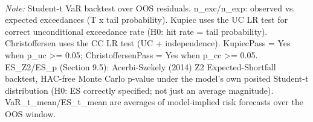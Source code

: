 \begin{table}[ht]
\begin{tabular}{lrrrrrrrrrrrrrrrrrrrrrrrrrrrrrr}
\bottomrule
\end{tabular}
\\[3pt]\footnotesize\textit{Note:} Student-t VaR backtest over OOS residuals. n_exc/n_exp: observed vs. expected exceedances (T x tail probability). Kupiec uses the UC LR test for correct unconditional exceedance rate (H0: hit rate = tail probability). Christoffersen uses the CC LR test (UC + independence). KupiecPass = Yes when p_uc >= 0.05; ChristoffersenPass = Yes when p_cc >= 0.05. ES_Z2/ES_p (Section 9.5): Acerbi-Szekely (2014) Z2 Expected-Shortfall backtest, HAC-free Monte Carlo p-value under the model's own posited Student-t distribution (H0: ES correctly specified; not just an average magnitude). VaR_t_mean/ES_t_mean are averages of model-implied risk forecasts over the OOS window.
\end{table}